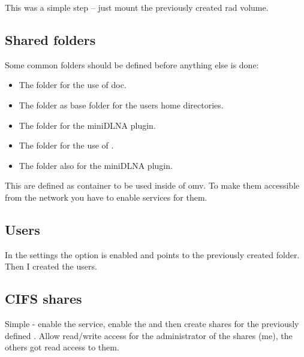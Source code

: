 This was a simple step -- just mount the previously created \gls{rad} volume.


\subsection{Shared folders}\label{subsec:Shared folders}

Some common folders should be defined before anything else is done:

\begin{itemize}
    \item The folder  for the use of \gls{doc}.
    \item The folder  as base folder for the users home directories.
    \item The folder  for the miniDLNA plugin.
    \item The folder  for the use of .
    \item The folder  also for the miniDLNA plugin.
\end{itemize}


This  are defined as container to be used inside
of \gls{omv}. To make them accessible from the network you have to enable
services for them.

\subsection{Users}

In the settings the option  is enabled and
points to the previously created  folder. Then I created
the users.


\subsection{CIFS shares}

Simple - enable the  service, enable the  and then create shares for the previously defined . Allow read/write access for the administrator of the shares (me),
the others got read access to them.

